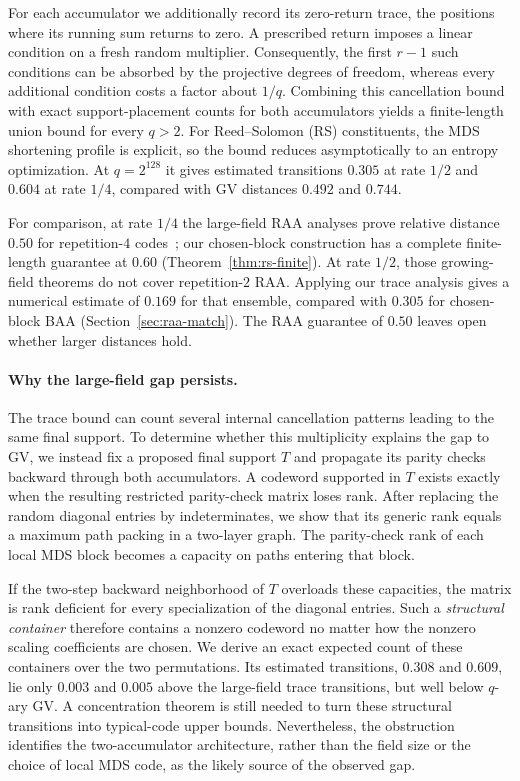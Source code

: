 \documentclass[runningheads,envcountsame,envcountsect]{llncs}
\begin{document}
For each accumulator we additionally record its zero-return trace, the positions
where its running sum returns to zero.  A prescribed return imposes a linear
condition on a fresh random multiplier.  Consequently, the first $r-1$ such
conditions can be absorbed by the projective degrees of freedom, whereas every
additional condition costs a factor about $1/q$.  Combining this cancellation
bound with exact support-placement counts for both accumulators yields a
finite-length union bound for every $q>2$.  For Reed--Solomon (RS) constituents, the
MDS shortening profile is explicit, so the bound reduces asymptotically to an
entropy optimization.  At $q=2^{128}$ it gives estimated transitions $0.305$
at rate $1/2$ and $0.604$ at rate $1/4$, compared with GV distances $0.492$ and
$0.744$.

For comparison, at rate $1/4$ the large-field RAA analyses prove relative
distance $0.50$ for repetition-$4$ codes~\cite{akhiani26,khabbazian26};
our chosen-block construction has a complete finite-length guarantee at
$0.60$ (Theorem~\ref{thm:rs-finite}).  At rate $1/2$, those growing-field
theorems do not cover repetition-$2$ RAA.  Applying our trace analysis gives
a numerical estimate of $0.169$ for that ensemble, compared with $0.305$
for chosen-block BAA (Section~\ref{sec:raa-match}).  The RAA guarantee of
$0.50$ leaves open whether larger distances hold.

\paragraph{Why the large-field gap persists.}
The trace bound can count several internal cancellation patterns leading to the
same final support.  To determine whether this multiplicity explains the gap to
GV, we instead fix a proposed final support $T$ and propagate its parity checks
backward through both accumulators.  A codeword supported in $T$ exists exactly
when the resulting restricted parity-check matrix loses rank.  After replacing
the random diagonal entries by indeterminates, we show that its generic rank
equals a maximum path packing in a two-layer graph.  The parity-check rank of
each local MDS block becomes a capacity on paths entering that block.

If the two-step backward neighborhood of $T$ overloads these capacities, the
matrix is rank deficient for every specialization of the diagonal entries.
Such a \emph{structural container} therefore contains a nonzero codeword no
matter how the nonzero scaling coefficients are chosen.  We derive an exact
expected count of these containers over the two permutations.  Its estimated
transitions, $0.308$ and $0.609$, lie only $0.003$ and $0.005$ above the
large-field trace transitions, but well below $q$-ary GV.  A concentration
theorem is still needed to turn these structural transitions into typical-code
upper bounds.  Nevertheless, the obstruction identifies the two-accumulator
architecture, rather than the field size or the choice of local MDS code, as
the likely source of the observed gap.
\end{document}
